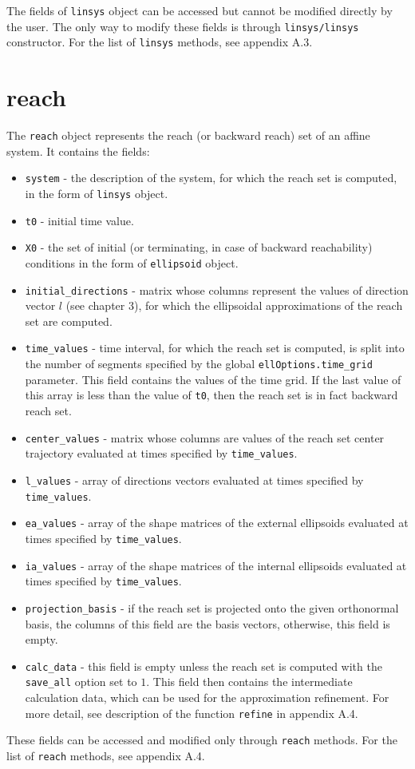 \documentclass{report}
\begin{document}
The fields of {\tt linsys} object can be accessed but cannot be modified
directly by the user. The only way to modify these fields is through
{\tt linsys/linsys} constructor.
For the list of {\tt linsys} methods, see appendix A.3.



\section{reach}
The {\tt reach} object represents the reach (or backward reach)
set of an affine system. It contains the fields:
\begin{itemize}
\item {\tt system} - the description of the system, for which the reach set
is computed, in the form of {\tt linsys} object.
\item {\tt t0} - initial time value.
\item {\tt X0} - the set of initial (or terminating, in case of backward
reachability) conditions in the form of {\tt ellipsoid}
object.
\item {\tt initial\_directions} - matrix whose columns represent the values
of direction vector $l$ (see chapter 3), for which the ellipsoidal
approximations of the reach set are computed.
\item {\tt time\_values} - time interval, for which the reach set is computed,
is split into the number of segments specified by the global
{\tt ellOptions.time\_grid} parameter. This field contains the values
of the time grid. If the last value of this array is less than the value
of {\tt t0}, then the reach set is in fact backward reach set.
\item {\tt center\_values} - matrix whose columns are values of the reach set
center trajectory evaluated at times specified by {\tt time\_values}.
\item {\tt l\_values} - array of directions vectors evaluated at times
specified by {\tt time\_values}.
\item {\tt ea\_values} - array of the shape matrices of the external ellipsoids
evaluated at times specified by {\tt time\_values}.
\item {\tt ia\_values} - array of the shape matrices of the internal ellipsoids
evaluated at times specified by {\tt time\_values}.
\item {\tt projection\_basis} - if the reach set is projected onto the given
orthonormal basis, the columns of this field are the basis vectors, otherwise,
this field is empty.
\item {\tt calc\_data} - this field is empty unless the reach set is computed
with the {\tt save\_all} option set to $1$. This field then contains the
intermediate calculation data, which can be used for the approximation
refinement. For more detail, see description of the function
{\tt refine} in appendix A.4.
\end{itemize}
These fields can be accessed and modified only through {\tt reach} methods.
For the list of {\tt reach} methods, see appendix A.4.
\end{document}
